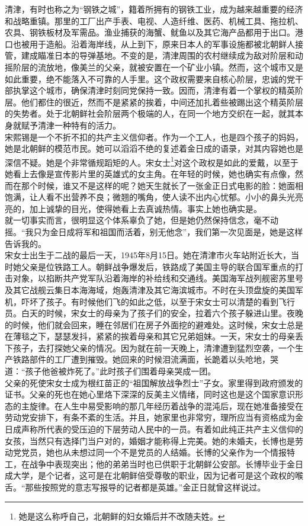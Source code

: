 \begin{multicols}{\theparacolNo}
清津，有时也称之为“钢铁之城”，籍着所拥有的钢铁工业，成为越来越重要的经济和战略重镇。那里的工厂出产手表、电视、人造纤维、医药、机械工具、拖拉机、农具、钢铁板材及军需品。渔业捕获的海蟹、鱿鱼以及其它海产品都用于出口。港口也被用于造船。沿着海岸线，从上到下，原来日本人的军事设施都被北朝鲜人接管，建成瞄准日本的导弹基地。不变的是，清津周围的农村继续成为敌对阶层和动摇阶层的流放地，像美兰的父亲，就被安置在一个矿业小镇。然而，这个城市又是如此重要，绝不能落入不可靠的人手里。这个政权需要来自核心阶层，忠诚的党干部执掌这个城市，确保清津时刻同党保持一致。因而，清津有着一个掌权的精英阶层。他们都住的很近，然而不是紧紧的挨着，中间还加扎着些被踢出这个精英阶层的失势者。处于北朝鲜社会阶层两个极端的人，在同一个地方交织在一起，就其本身就赋予清津一种特有的活力。\\

宋熙锡是一个不折不扣的共产主义信仰者。作为一个工人，也是四个孩子的妈妈，她是北朝鲜的模范市民。她可以滔滔不绝的复述着金日成的语录，对其内容她也是深信不疑。她是个非常循规蹈矩的人。宋女士\footnote{她是这么称呼自己，北朝鲜的妇女婚后并不改随夫姓。}对这个政权是如此的爱戴，以至于她看上去像是宣传影片里的英雄式的女主角。在年轻的时候，她也确实有点像，然而在那个时候，谁又不是这样的呢？她天生就长了一张金正日式电影的脸：她面相饱满，让人看不出营养不良；微翘的嘴角，使人读不出内心忧郁。小小的鼻头光亮亮的，加上诚挚的目光，使得她看上去真诚热情。事实上她也确实是。\\

就一切事实而言，很明显这个体系辜负了她，但是她仍然保持信念，毫不动摇。“我只为金日成将军和祖国而活着，别无他念”，我们第一次见面是，她是这样告诉我的。\\

宋女士出生于二战的最后一天，1945年8月15日。她在清津市火车站附近长大，当时她父亲是位铁路工人。朝鲜战争爆发后，铁路成了美国主导的联合国军重点的打击对象，以掐断共产党军队沿着海岸的补给线和交通线。美国海军战列舰密苏里号及其它战舰云集日本海海域，炮轰清津及其它海滨城市。不时在头顶盘旋的美国军机，吓坏了孩子。有时候他们飞的如此之低，以至于宋女士可以清楚的看到飞行员。白天的时候，宋女士的母亲为了孩子们的安全，拉着六个孩子躲进山里。夜晚的时候，他们就会回来，睡在邻居们在房子外面挖的避难处。这时候，宋女士总是在薄毯之下，瑟瑟发抖，紧紧的挨着母亲和其它兄弟姐妹。一天，宋女士的母亲丢下孩子，去打探她父亲的情况。因为就在前一天晚上，清津遭到猛烈空袭，一个生产铁路部件的工厂遭到摧毁。她回来的时候泪流满面，长跪着以头呛地，哭道：“孩子他爸被炸死了。”此时孩子们围着母亲哭成一团。\\

父亲的死使宋女士成为根红苗正的“祖国解放战争烈士”子女。家里得到政府颁发的证书。父亲的死也在她心里烙下深深的反美主义情绪，同时这也是这个国家意识形态的主旋律。在人生中易受影响的那几年经历着战争的混沌后，现在她准备接受在劳动党安排下，有条不紊的生活。并且，她家里也非常穷，理所应当有资格成为金日成声称所代表的受压迫的下层劳动人民中的一员。有着如此纯正共产主义信仰的女孩，当然只有选择门当户对的，婚姻才能称得上完美。她的未婚夫，长博也是劳动党党员，她也从未想过同一个不是党员的人结婚。长博的父亲作为一个情报特工，在战争中表现突出；他的弟弟当时也已供职于北朝鲜公安部。长博毕业于金日成大学，是个记者，这可是在北朝鲜倍受尊敬的职业，因为记者可是这个政权的喉舌。“那些按照党的意志写报导的记者都是英雄。”金正日就曾这样说过。\\


\end{multicols}
